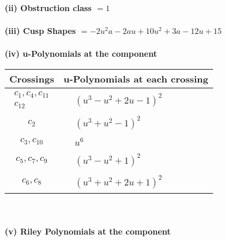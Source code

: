 \documentclass[1p]{elsarticle_modified}
\theoremstyle{definition}
\begin{document}
\flushleft \textbf{(ii) Obstruction class $= 1$}\\~\\
\flushleft \textbf{(iii) Cusp Shapes $= -2 u^2 a-2 a u+10 u^2+3 a-12 u+15$}\\~\\
\newpage\renewcommand{\arraystretch}{1}
\flushleft \textbf{(iv) u-Polynomials at the component}\newline \\
\begin{tabular}{m{50pt}|m{274pt}}
Crossings & \hspace{64pt}u-Polynomials at each crossing \\
\hline $$\begin{aligned}c_{1},c_{4},c_{11}\\c_{12}\end{aligned}$$&$\begin{aligned}
&(u^3- u^2+2 u-1)^2
\end{aligned}$\\
\hline $$\begin{aligned}c_{2}\end{aligned}$$&$\begin{aligned}
&(u^3+u^2-1)^2
\end{aligned}$\\
\hline $$\begin{aligned}c_{3},c_{10}\end{aligned}$$&$\begin{aligned}
&u^6
\end{aligned}$\\
\hline $$\begin{aligned}c_{5},c_{7},c_{9}\end{aligned}$$&$\begin{aligned}
&(u^3- u^2+1)^2
\end{aligned}$\\
\hline $$\begin{aligned}c_{6},c_{8}\end{aligned}$$&$\begin{aligned}
&(u^3+u^2+2 u+1)^2
\end{aligned}$\\
\hline
\end{tabular}\\~\\
\newpage\renewcommand{\arraystretch}{1}
\flushleft \textbf{(v) Riley Polynomials at the component}\newline \\
\end{document}
